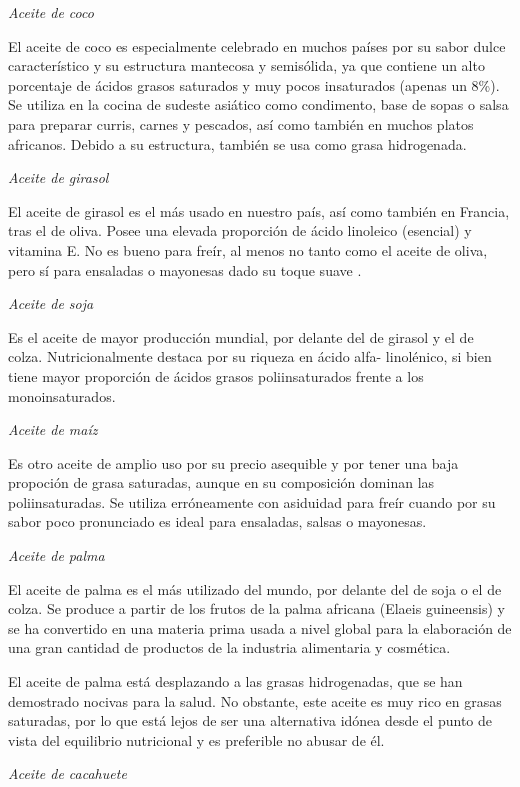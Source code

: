 \documentclass[a4paper,12pt]{article}
\begin{document}
\begin{multicols}{2}
\textit{Aceite de coco}

El aceite de coco es especialmente celebrado en muchos países por su sabor dulce característico y su estructura mantecosa y semisólida, ya que contiene un alto porcentaje de ácidos grasos saturados y muy pocos insaturados (apenas un 8\%). Se utiliza en la cocina de sudeste asiático como condimento, base de sopas o salsa para preparar curris, carnes y pescados, así como también en muchos platos africanos. Debido a su estructura, también se usa como grasa hidrogenada.

\textit{Aceite de girasol}

El aceite de girasol es el más usado en nuestro país, así como también en Francia, tras el de oliva. Posee una elevada proporción de ácido linoleico (esencial) y vitamina E. No es bueno para freír, al menos no tanto como el aceite de oliva, pero sí para ensaladas o mayonesas dado su toque suave \cite{FernandezMartinez2009}. 

\textit{Aceite de soja}

Es el aceite de mayor producción mundial, por delante del de girasol y el de colza. Nutricionalmente destaca por su riqueza en ácido alfa- linolénico, si bien tiene mayor proporción de ácidos grasos poliinsaturados frente a los monoinsaturados. 

\textit{Aceite de maíz}

Es otro aceite de amplio uso por su precio asequible y por tener una baja propoción de grasa saturadas, aunque en su composición dominan las poliinsaturadas. Se utiliza erróneamente con asiduidad para freír cuando por su sabor poco pronunciado es ideal para ensaladas, salsas o mayonesas.

\textit{Aceite de palma}

El aceite de palma es el más utilizado del mundo, por delante del de soja o el de colza. Se produce a partir de los frutos de la palma africana (Elaeis guineensis) y se ha convertido en una materia prima usada a nivel global para la elaboración de una gran cantidad de productos de la industria alimentaria y cosmética.
 
El aceite de palma está desplazando a las grasas hidrogenadas, que se han demostrado nocivas para la salud. No obstante, este aceite es muy rico en grasas saturadas, por lo que está lejos de ser una alternativa idónea desde el punto de vista del equilibrio nutricional y es preferible no abusar de él.

\textit{Aceite de cacahuete}


\end{multicols}
\end{document}
